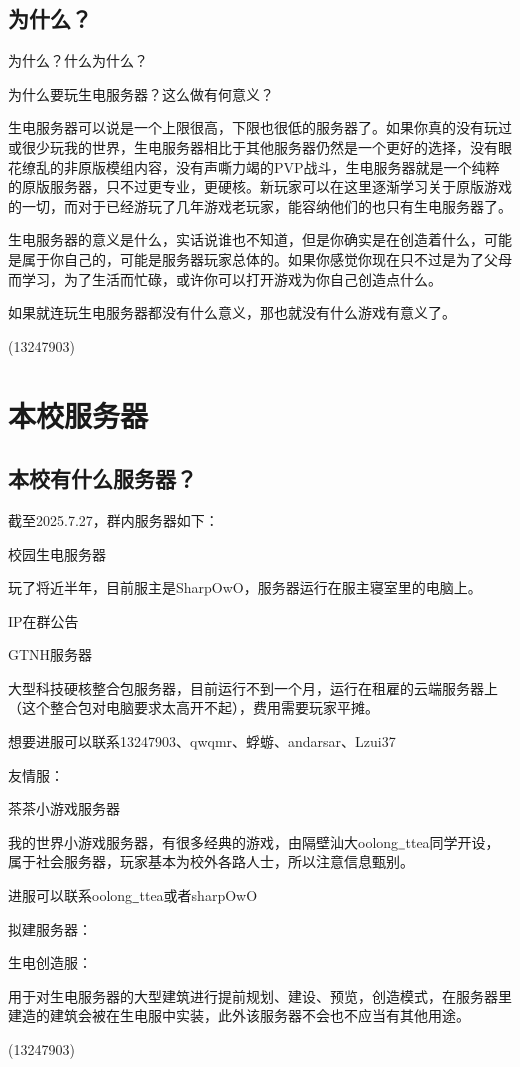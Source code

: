 \documentclass[UTF8,a4paper]{article}
\begin{document}
		\subsection{为什么？}
			\par 为什么？什么为什么？
			\par 为什么要玩生电服务器？这么做有何意义？
			\par 生电服务器可以说是一个上限很高，下限也很低的服务器了。如果你真的没有玩过或很少玩我的世界，生电服务器相比于其他服务器仍然是一个更好的选择，没有眼花缭乱的非原版模组内容，没有声嘶力竭的PVP战斗，生电服务器就是一个纯粹的原版服务器，只不过更专业，更硬核。新玩家可以在这里逐渐学习关于原版游戏的一切，而对于已经游玩了几年游戏老玩家，能容纳他们的也只有生电服务器了。
			\par 生电服务器的意义是什么，实话说谁也不知道，但是你确实是在创造着什么，可能是属于你自己的，可能是服务器玩家总体的。如果你感觉你现在只不过是为了父母而学习，为了生活而忙碌，或许你可以打开游戏为你自己创造点什么。
			\par 如果就连玩生电服务器都没有什么意义，那也就没有什么游戏有意义了。
			\begin{flushright}(13247903)\end{flushright}
	
	\section{本校服务器}
		\subsection{本校有什么服务器？}
			\par 截至2025.7.27，群内服务器如下：
			\par
			\par 校园生电服务器
			\par 玩了将近半年，目前服主是SharpOwO，服务器运行在服主寝室里的电脑上。
			\par IP在群公告
			\par 
			\par GTNH服务器
			\par 大型科技硬核整合包服务器，目前运行不到一个月，运行在租雇的云端服务器上（这个整合包对电脑要求太高开不起），费用需要玩家平摊。
			\par 想要进服可以联系13247903、qwqmr、蜉蝣、andarsar、Lzui37
			\par 
			\par 友情服：
			\par 茶茶小游戏服务器
			\par 我的世界小游戏服务器，有很多经典的游戏，由隔壁汕大oolong$\underline{\makebox[1ex]{}}$ttea同学开设，属于社会服务器，玩家基本为校外各路人士，所以注意信息甄别。
			\par 进服可以联系oolong$\underline{\makebox[1ex]{}}$ttea或者sharpOwO
			\par
			\par 拟建服务器：
			\par 生电创造服：
			\par 用于对生电服务器的大型建筑进行提前规划、建设、预览，创造模式，在服务器里建造的建筑会被在生电服中实装，此外该服务器不会也不应当有其他用途。
			\begin{flushright}(13247903)\end{flushright}
\end{document}
